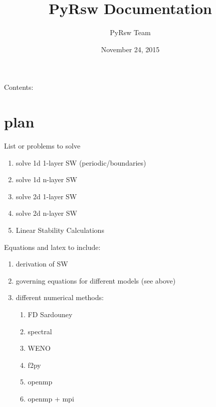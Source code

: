 \documentclass[letterpaper,10pt,english]{sphinxmanual}
\title{PyRsw Documentation}
\date{November 24, 2015}
\author{PyRsw Team}
\begin{document}
\maketitle
\tableofcontents
{}\label{index::doc}


Contents:


\chapter{plan}
\label{plan::doc}\label{plan:plan}\label{plan:welcome-to-pyrsw-s-documentation}
List or problems to solve
\begin{enumerate}
\item {} 
solve 1d 1-layer SW (periodic/boundaries)

\item {} 
solve 1d n-layer SW

\item {} 
solve 2d 1-layer SW

\item {} 
solve 2d n-layer SW

\item {} 
Linear Stability Calculations

\end{enumerate}

Equations and latex to include:
\begin{enumerate}
\item {} 
derivation of SW

\item {} 
governing equations for different models (see above)

\item {} 
different numerical methods:
\begin{enumerate}
\item {} 
FD Sardouney

\item {} 
spectral

\item {} 
WENO

\item {} 
f2py

\item {} 
openmp

\item {} 
openmp + mpi

\end{enumerate}

\end{enumerate}
\end{document}
